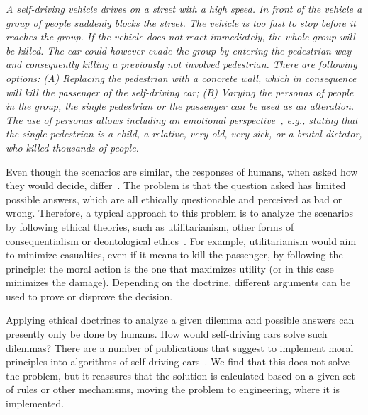 \textit{
A self-driving vehicle drives on a street with a high speed. In front of the vehicle a group of people suddenly blocks the street. The vehicle is too fast to stop before it reaches the group. If the vehicle does not react immediately, the whole group will be killed. The car could however evade the group by entering the pedestrian way and consequently killing a previously not involved pedestrian. There are following options: (A) Replacing the pedestrian with a concrete wall, which in consequence will kill the passenger of the self-driving car; (B) Varying the personas of people in the group, the single pedestrian or the passenger can be used as an alteration. The use of personas allows including an emotional perspective~\cite{BleskeRechek2010}, e.g., stating that the single pedestrian is a child, a relative, very old, very sick, or a brutal dictator, who killed thousands of people.}

Even though the scenarios are similar, the responses of humans, when asked how they would decide, differ~\cite{Bonnefon2016}. The problem is that the question asked has limited possible answers, which are all ethically questionable and perceived as bad or wrong. Therefore, a typical approach to this problem is to analyze the scenarios by following ethical theories, such as utilitarianism, other forms of consequentialism or deontological ethics~\cite{mackinnon2012ethics}. For example, utilitarianism would aim to minimize casualties, even if it means to kill the passenger, by following the principle: the moral action is the one that maximizes utility (or in this case minimizes the damage). Depending on the doctrine, different arguments can be used to prove or disprove the decision. 

Applying ethical doctrines to analyze a given dilemma and possible answers can presently only be done by humans. How would self-driving cars solve such dilemmas? There are a number of publications that suggest to implement moral principles into algorithms of self-driving cars~\cite{Goodall2016,DENNIS20161,Dennis2014}. We find that this does not solve the problem, but it reassures that the solution is calculated based on a given set of rules or other mechanisms, moving the problem to engineering, where it is implemented.

